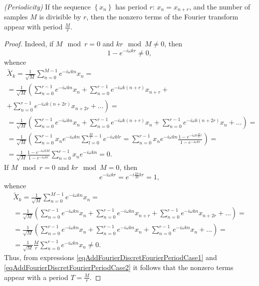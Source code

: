\begin{lemma}
\emph{(Periodicity)}
\label{lemmaAddFourierDiscretFourierPeriod}
If the sequence $\left\{x_n\right\}$ has period $r$: $x_n =
x_{n + r}$, and the number of samples $M$ is divisible by $r$, then the nonzero terms
of the Fourier transform appear with period $\frac{M}{r}$.
\begin{proof}
Indeed, if $M \mod r = 0$ and $k r \mod M \ne 0$,
then
\[
1 - e^{-i \omega k r} \ne 0,
\]
whence
\begin{eqnarray}
\tilde{X}_k = \frac{1}{\sqrt{M}}\sum_{n = 0}^{M - 1}e^{-i \omega k n}x_n = 
\nonumber \\
= \frac{1}{\sqrt{M}} \left(
\sum_{n = 0}^{r - 1}e^{-i \omega k n} x_n + 
\sum_{n = 0}^{r - 1}e^{-i \omega k \left(n + r \right) } x_{n+r} +
\right.
\nonumber \\
\left. +
\sum_{n = 0}^{r - 1}e^{-i \omega k \left(n + 2r \right) } x_{n+2r} + 
\dots  \right)=
\nonumber \\
= \frac{1}{\sqrt{M}} \left(
\sum_{n = 0}^{r - 1}e^{-i \omega k n} x_n + 
\sum_{n = 0}^{r - 1}e^{-i \omega k \left(n + r \right) } x_n + 
\sum_{n = 0}^{r - 1}e^{-i \omega k \left(n + 2r \right) } x_n + 
\dots \right) =
\nonumber \\
= \frac{1}{\sqrt{M}} \left( \sum_{n = 0}^{r - 1} x_n e^{-i \omega k n} 
\sum_{l = 0}^{\frac{M}{r}- 1} e^{-i \omega k l r } = 
\sum_{n = 0}^{r - 1} x_n e^{-i \omega k n} 
\frac{1 - e^{-i \omega k \frac{M}{r} r }}{1 - e^{-i \omega k r }}
\right) = 
\nonumber \\
=
\frac{1}{\sqrt{M}}
\frac{1 - e^{-i \omega k M }}{1 - e^{-i \omega k r}}
\sum_{n = 0}^{r - 1} x_n e^{-i \omega k n} = 0.
\label{eqAddFourierDiscretFourierPeriodCase1}
\end{eqnarray}
If $M \mod r = 0$ and $k r \mod M = 0$, then
\[
e^{-i \omega k r } = e^{-i \frac{2 \pi }{M} k r } = 1,
\]
whence
\begin{eqnarray}
\tilde{X}_k = \frac{1}{\sqrt{M}} \sum_{n = 0}^{M - 1}e^{-i \omega k n}x_n = 
\nonumber \\
= \frac{1}{\sqrt{M}} \left(
\sum_{n = 0}^{r - 1}e^{-i \omega k n} x_n + 
\sum_{n = 0}^{r - 1}e^{-i \omega k n } x_{n+r} + 
\sum_{n = 0}^{r - 1}e^{-i \omega k n } x_{n+2r} + 
\dots \right)=
\nonumber \\
= \frac{1}{\sqrt{M}} \left(
\sum_{n = 0}^{r - 1}e^{-i \omega k n} x_n + 
\sum_{n = 0}^{r - 1}e^{-i \omega k n  } x_n + 
\sum_{n = 0}^{r - 1}e^{-i \omega k n  } x_n + 
\dots \right) = 
\nonumber \\ 
= \frac{1}{\sqrt{M}} \frac{M}{r} \sum_{n = 0}^{r - 1}e^{-i \omega k n  } x_n \ne 0.
\label{eqAddFourierDiscretFourierPeriodCase2}
\end{eqnarray}
Thus, from expressions 
\eqref{eqAddFourierDiscretFourierPeriodCase1} and 
\eqref{eqAddFourierDiscretFourierPeriodCase2} it follows that
the nonzero terms appear with a period $T = \frac{M}{r}$.
\end{proof}
\end{lemma}

